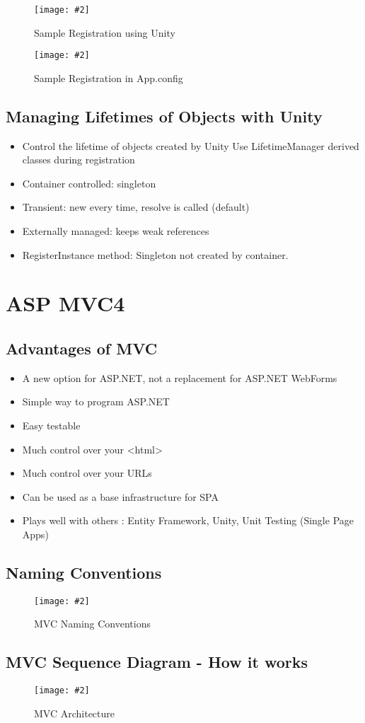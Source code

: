 \documentclass[a4paper,10pt]{scrreprt}
\newcommand{\pic}[2][figure]{\begin{figure}[h]
 \centering
 \texttt{[image: \#2]}
 \caption{#1}
\end{figure}
}
\begin{document}
\pic[Sample Registration using Unity]{regdi.png}
\pic[Sample Registration in App.config]{regconf.png}

\section{Managing Lifetimes of Objects with Unity}
\begin{itemize}
\item Control the lifetime of objects created by Unity
Use LifetimeManager derived classes during
registration
\item Container controlled: singleton
\item  Transient: new every time, resolve is called
(default)
\item Externally managed: keeps weak references
\item RegisterInstance method: Singleton not created by container.
\end{itemize}

\chapter{ASP MVC4}
\section{Advantages of MVC}
\begin{itemize}
\item A new option for ASP.NET, not a replacement
for ASP.NET WebForms
\item Simple way to program ASP.NET
\item Easy testable
\item Much control over your <html>
\item Much control over your URLs
\item Can be used as a base infrastructure for SPA
\item Plays well with others : Entity Framework, Unity, Unit Testing
(Single Page Apps)
\end{itemize}
\section{Naming Conventions}
\pic[MVC Naming Conventions]{mvcname.png}
\section{MVC Sequence Diagram - How it works}
\pic[MVC Architecture]{mvcarch.png}
\end{document}
